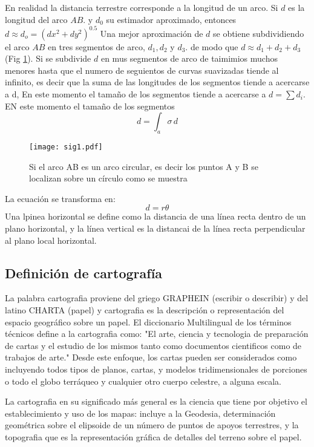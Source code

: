 En realidad la distancia terrestre corresponde a la longitud de un arco. Si $d$ es la longitud del arco $AB$. y $d_0$ su estimador aproximado, entonces $d\approx d_o = \left(dx^2+dy^2\right)^{0.5}$ Una mejor aproximación de $d$ se obtiene subdividiendo el arco $AB$ en tres segmentos de arco, $d_1, d_2$ y $d_3$. de modo que $d\approx d_1+d_2+d_3$ (Fig \ref{sig1}). Si se subdivide $d$ en mus segmentos de arco de taimimios muchos menores hasta que el numero de seguientos de curvas suavizadas tiende al infinito, es decir que la suma de las longitudes de los segmentos tiende a acercarse a d, En este momento el tamaño de los segmentos tiende a acercarse a $d=\sum d_i$. EN este momento el tamaño de los segmentos
\begin{equation}
    d =\int_a \sigma\,d
\end{equation}
\begin{figure}[h!]
\centering
  \texttt{[image: sig1.pdf]}
  \caption{Si el arco AB es un arco circular, es decir los puntos A y B se localizan sobre un círculo como se muestra}
  \label{sig1}
\end{figure}
La ecuación se transforma en:
\begin{equation}
    d = r\theta
\end{equation}
Una lpinea horizontal se define como la distancia de una línea recta dentro de un plano horizontal, y la línea vertical es la distancai de la línea recta perpendicular al plano local horizontal.

\subsection{Definición de cartografía}
La palabra cartografia proviene del griego GRAPHEIN (escribir o describir) y del latino CHARTA (papel) y cartografia es la descripción o representación del espacio geográfico sobre un papel. El diccionario Multilingual de los términos técnicos define a la cartografia como: "El arte, ciencia y tecnologia de preparación de cartas y el estudio de los mismos tanto como documentos cientificos como de trabajos de arte." Desde este enfoque, los cartas pueden ser considerados como incluyendo todos tipos de planos, cartas, y modelos tridimensionales de porciones o todo el globo terráqueo y cualquier otro cuerpo celestre, a alguna escala.

La cartografia en su significado más general es la ciencia que tiene por objetivo el establecimiento y uso de los mapas: incluye a la Geodesia, determinación geométrica sobre el elipsoide de un número de puntos de apoyos terrestres, y la topografia que es la representación gráfica de detalles del terreno sobre el papel.

